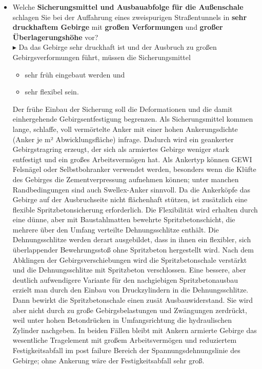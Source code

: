 \documentclass[fleqn,twoside]{article}
\begin{document}
\begin{small}
\begin{itemize}
    \item Welche \textbf{Sicherungsmittel und Ausbauabfolge für die Außenschale} schlagen Sie bei der Auffahrung eines zweispurigen Straßentunnels in \textbf{sehr druckhaftem Gebirge} mit \textbf{großen Verformungen} und \textbf{großer Überlagerungshöhe} vor?\\
    $\blacktriangleright$ Da das Gebirge sehr druckhaft ist und der Ausbruch zu großen Gebirgsverformungen führt, müssen die Sicherungsmittel
        \begin{itemize}
            \item sehr früh eingebaut werden und
            \item sehr flexibel sein.
        \end{itemize}
    Der frühe Einbau der Sicherung soll die Deformationen und die damit einhergehende Gebirgsentfestigung begrenzen. Als Sicherungsmittel kommen lange, schlaffe, voll vermörtelte Anker mit einer hohen Ankerungsdichte (Anker je m² Abwicklungsfläche) infrage. Dadurch wird ein geankerter Gebirgstragring erzeugt, der sich als armiertes Gebirge weniger stark entfestigt und ein großes Arbeitsvermögen hat. Als Ankertyp können GEWI Felsnägel oder Selbstbohranker verwendet werden, besonders wenn die Klüfte des Gebirges die Zementverpressung aufnehmen können; unter manchen Randbedingungen sind auch Swellex-Anker sinnvoll. Da die Ankerköpfe das Gebirge auf der Ausbruchseite nicht flächenhaft stützen, ist zusätzlich eine flexible Spritzbetonsicherung erforderlich. Die Flexibilität wird erhalten durch eine dünne, aber mit Baustahlmatten bewehrte Spritzbetonschicht, die mehrere über den Umfang verteilte Dehnungsschlitze enthält. Die Dehnungsschlitze werden derart ausgebildet, dass in ihnen ein flexibler, sich überlappender Bewehrungsstoß ohne Spritzbeton hergestellt wird. Nach dem Abklingen der Gebirgsverschiebungen wird die Spritzbetonschale verstärkt und die Dehnungsschlitze mit Spritzbeton verschlossen. Eine bessere, aber deutlich aufwendigere Variante für den nachgiebigen Spritzbetonausbau erzielt man durch den Einbau von Druckzylindern in die Dehnungsschlitze. Dann bewirkt die Spritzbetonschale einen zusät Ausbauwiderstand. Sie wird aber nicht durch zu große Gebirgsbelastungen und Zwängungen zerdrückt, weil unter hohen Betondrücken in Umfangsrichtung die hydraulischen Zylinder nachgeben. In beiden Fällen bleibt mit Ankern armierte Gebirge das wesentliche Tragelement mit großem Arbeitsvermögen und reduziertem Festigkeitsabfall im post failure Bereich der Spannungsdehnungslinie des Gebirge; ohne Ankerung wäre der Festigkeitsabfall sehr groß.
    

\end{itemize}
\end{small}
\end{document}
